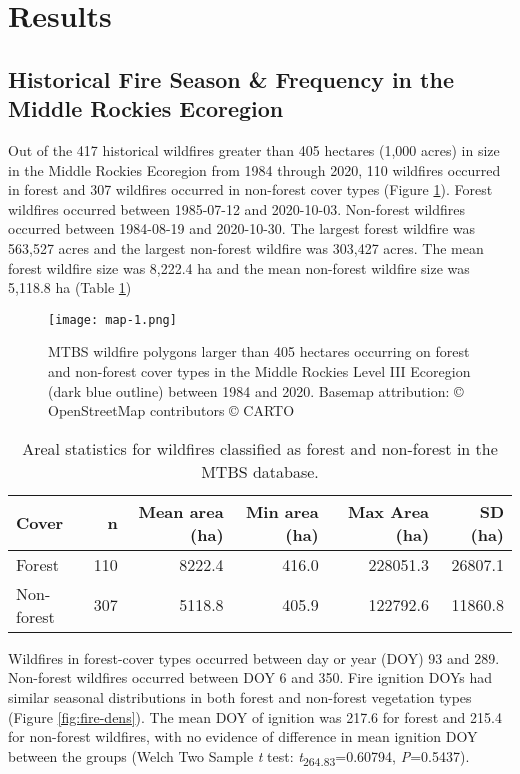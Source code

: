 \documentclass[11p]{article}
\begin{document}
\section{Results}

\subsection{Historical Fire Season \& Frequency in the Middle Rockies Ecoregion}

Out of the 417 historical wildfires greater than 405 hectares (1,000 acres) in size in the Middle Rockies Ecoregion from 1984 through 2020, 110 wildfires occurred in forest and 307 wildfires occurred in non-forest cover types (Figure \ref{fig:map}). Forest wildfires occurred between 1985-07-12 and 2020-10-03. Non-forest wildfires occurred between 1984-08-19 and 2020-10-30. The largest forest wildfire was 563,527 acres and the largest non-forest wildfire was 303,427 acres. The mean forest wildfire size was 8,222.4 ha and the mean non-forest wildfire size was 5,118.8 ha (Table \ref{tab:mtbs-stats})

\begin{figure}[htbp]
  \texttt{[image: map-1.png]}
  \caption{MTBS wildfire polygons larger than 405 hectares occurring on forest and non-forest cover types in the Middle Rockies Level III Ecoregion (dark blue outline) between 1984 and 2020. Basemap attribution: © OpenStreetMap contributors © CARTO}
  \label{fig:map}
\end{figure}

\begin{table}
  \centering
  \begin{tabular}{lrrrrr}
    \hline
    Cover      & n   & Mean area (ha) & Min area (ha) & Max Area (ha) & SD (ha) \\
    \hline
    Forest     & 110 & 8222.4         & 416.0         & 228051.3      & 26807.1 \\
    Non-forest & 307 & 5118.8         & 405.9         & 122792.6      & 11860.8  \\
  \end{tabular}
  \caption{Areal statistics for wildfires classified as forest and non-forest in the MTBS database.}
  \label{tab:mtbs-stats}
\end{table}

Wildfires in forest-cover types occurred between day or year (DOY) 93 and 289. Non-forest wildfires occurred between DOY 6 and 350. Fire ignition DOYs had similar seasonal distributions in both forest and non-forest vegetation types (Figure \ref{fig:fire-dens}). The mean DOY of ignition was 217.6 for forest and 215.4 for non-forest wildfires, with no evidence of difference in mean ignition DOY between the groups (Welch Two Sample \textit{t} test: \textit{t}\textsubscript{264.83}=0.60794, \textit{P}=0.5437).
\end{document}
